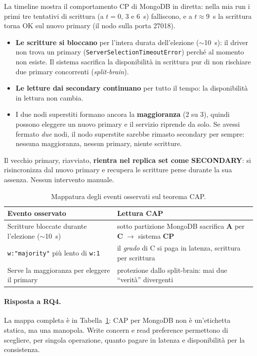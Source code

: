 \documentclass{article}
\begin{document}
La timeline mostra il comportamento CP di MongoDB in diretta: nella mia run i
primi tre tentativi di scrittura (a $t=0$, 3 e 6~s) falliscono, e a $t\approx9$~s
la scrittura torna OK sul nuovo primary (il nodo sulla porta 27018).
\begin{itemize}
    \item \textbf{Le scritture si bloccano} per l'intera durata dell'elezione
    ($\sim$10~s): il driver non trova un primary
    (\texttt{ServerSelection\allowbreak Timeout\allowbreak Error}) perché al
    momento non esiste. Il sistema sacrifica la disponibilità in scrittura pur di
    non rischiare due primary concorrenti (\emph{split-brain}).
    \item \textbf{Le letture dai secondary continuano} per tutto il tempo: la
    disponibilità in lettura non cambia.
    \item I due nodi superstiti formano ancora la \textbf{maggioranza} (2 su 3),
    quindi possono eleggere un nuovo primary e il servizio riprende da solo. Se
    avessi fermato \emph{due} nodi, il nodo superstite sarebbe rimasto secondary
    per sempre: nessuna maggioranza, nessun primary, niente scritture.
\end{itemize}

Il vecchio primary, riavviato, \textbf{rientra nel replica set come SECONDARY}: si
risincronizza dal nuovo primary e recupera le scritture perse durante la sua
assenza. Nessun intervento manuale.

\begin{table}[H]
\centering
\caption{Mappatura degli eventi osservati sul teorema CAP.}
\label{tab:cap}
\begin{tabular}{p{7.2cm}p{8.0cm}}
\toprule
Evento osservato & Lettura CAP \\
\midrule
Scritture bloccate durante l'elezione ($\sim$10~s) & sotto partizione MongoDB
sacrifica \textbf{A} per \textbf{C} $\rightarrow$ sistema \textbf{CP} \\
\texttt{w:"majority"} più lento di \texttt{w:1} & il \emph{grado} di C si paga in
latenza, scrittura per scrittura \\
Serve la maggioranza per eleggere il primary & protezione dallo split-brain: mai due
``verità'' divergenti \\
\bottomrule
\end{tabular}
\end{table}

\paragraph{Risposta a RQ4.} La mappa completa è in Tabella~\ref{tab:cap}: CAP per
MongoDB non è un'etichetta statica, ma una manopola. Write concern e read
preference permettono di scegliere, per singola operazione, quanto pagare in
latenza e disponibilità per la consistenza.
\end{document}
